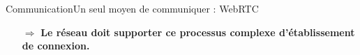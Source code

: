 \begin{frame}{Communication}{Un seul moyen de communiquer : WebRTC}
  
  
  \vspace{0.5cm}
  
  \large
  \begin{itemize}
  \item [$\Rightarrow$] \textbf{Le réseau doit supporter ce processus complexe
      d'établissement de connexion.}
  \end{itemize}
  

  
\end{frame}






